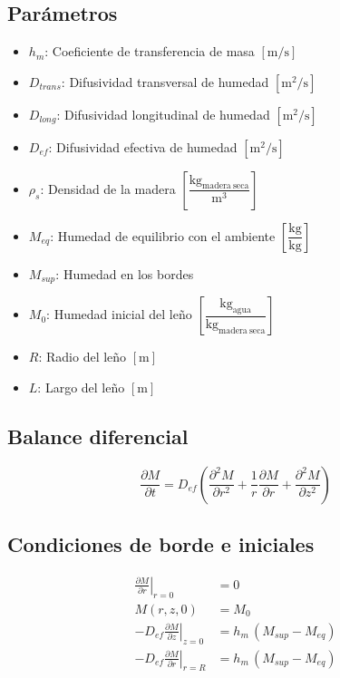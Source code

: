 \documentclass[11pt,a4paper]{article}
\begin{document}
\subsection{Parámetros}

\begin{itemize}[noitemsep]
    \item $h_m$: Coeficiente de transferencia de masa $\left[\mathrm{m/s}\right]$
    \item $D_{trans}$: Difusividad transversal de humedad $\left[\mathrm{m^2/s}\right]$
    \item $D_{long}$: Difusividad longitudinal de humedad $\left[\mathrm{m^2/s}\right]$
    \item $D_{ef}$: Difusividad efectiva de humedad $\left[\mathrm{m^2/s}\right]$
    \item $\rho_s$: Densidad de la madera $\left[\dfrac{\mathrm{kg_{madera\ seca}}}{\mathrm{m^3}}\right]$
    \item $M_{eq}$: Humedad de equilibrio con el ambiente $\left[\dfrac{\mathrm{kg}}{\mathrm{kg}}\right]$
    \item $M_{sup}$: Humedad en los bordes
    \item $M_0$: Humedad inicial del leño $\left[\dfrac{\mathrm{kg_{agua}}}{\mathrm{kg_{madera\ seca}}}\right]$
    \item $R$: Radio del leño $[\mathrm{m}]$
    \item $L$: Largo del leño $[\mathrm{m}]$
\end{itemize}

\subsection{Balance diferencial}

\begin{equation}
    \frac{\partial M}{\partial t} = D_{ef}\left(\frac{\partial^2 M}{\partial r^2} + \frac{1}{r}\frac{\partial M}{\partial r} + \frac{\partial^2 M}{\partial z^2}\right)
\end{equation}

\subsection{Condiciones de borde e iniciales}

\begin{align}
    \left.\frac{\partial M}{\partial r}\right|_{r=0} &= 0 \\
    M(r,z,0) &= M_0 \\
    -D_{ef}\left.\frac{\partial M}{\partial z}\right|_{z=0} &= h_m\,(M_{sup} - M_{eq}) \\
    -D_{ef}\left.\frac{\partial M}{\partial r}\right|_{r=R} &= h_m\,(M_{sup} - M_{eq})
\end{align}
\end{document}
